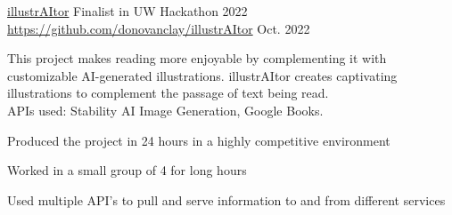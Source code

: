 
\entry
    {\href{https://devpost.com/software/illustraitor}{illustrAItor}}
    {Finalist in UW Hackathon 2022 \quad\href{https://github.com/donovanclay/illustrAItor}{https://github.com/donovanclay/illustrAItor}}
    {Oct. 2022}
    {
        This project makes reading more enjoyable by complementing it with customizable AI-generated illustrations. illustrAItor creates captivating illustrations to complement the passage of text being read.\\
        APIs used: Stability AI Image Generation, Google Books.
        \begin{condenseditemize}
            \item Produced the project in 24 hours in a highly competitive environment
            \item Worked in a small group of 4 for long hours
            \item Used multiple API's to pull and serve information to and from different services
        \end{condenseditemize}
    }
    